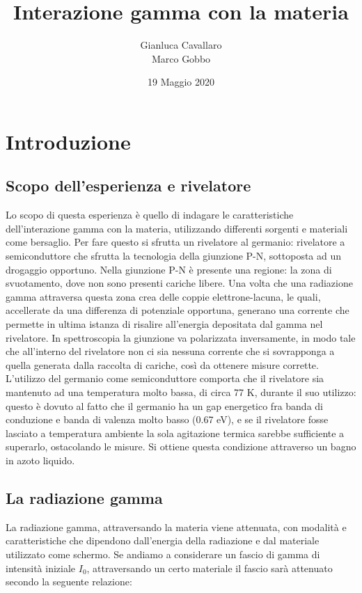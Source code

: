 \documentclass[a4paper,10pt]{article}
\title{Interazione gamma con la materia}
\author{Gianluca Cavallaro \\ Marco Gobbo}
\date{19 Maggio 2020}
\begin{document}
\maketitle


\section{Introduzione}
\subsection{Scopo dell'esperienza e rivelatore}
Lo scopo di questa esperienza \`e quello di indagare le caratteristiche dell'interazione gamma con la materia, utilizzando differenti sorgenti e materiali come bersaglio. Per fare questo si sfrutta un rivelatore al germanio: rivelatore a semiconduttore che sfrutta la tecnologia della giunzione P-N, sottoposta ad un drogaggio opportuno. Nella giunzione P-N \`e presente una regione: la zona di svuotamento, dove non sono presenti cariche libere. Una volta che una radiazione gamma attraversa questa zona crea delle coppie elettrone-lacuna, le quali, accellerate da una differenza di potenziale opportuna, generano una corrente che permette in ultima istanza di risalire all'energia depositata dal gamma nel rivelatore. In spettroscopia la giunzione va polarizzata inversamente, in modo tale che all'interno del rivelatore non ci sia nessuna corrente che si sovrapponga a quella generata dalla raccolta di cariche, cos\`i da ottenere misure corrette. L'utilizzo del germanio come semiconduttore comporta che il rivelatore sia mantenuto ad una temperatura molto bassa, di circa 77 K, durante il suo utilizzo: questo \`e dovuto al fatto che il germanio ha un gap energetico fra banda di conduzione e banda di valenza molto basso (0.67 eV), e se il rivelatore fosse lasciato a temperatura ambiente la sola agitazione termica sarebbe sufficiente a superarlo, ostacolando le misure. Si ottiene questa condizione attraverso un bagno in azoto liquido.

\subsection{La radiazione gamma}
\noindent La radiazione gamma, attraversando la materia viene attenuata, con modalit\`a e caratteristiche che dipendono dall'energia della radiazione e dal materiale utilizzato come schermo. Se andiamo a considerare un fascio di gamma di intensit\`a iniziale $I_0$, attraversando un certo materiale il fascio sar\`a attenuato secondo la seguente relazione:
\end{document}
